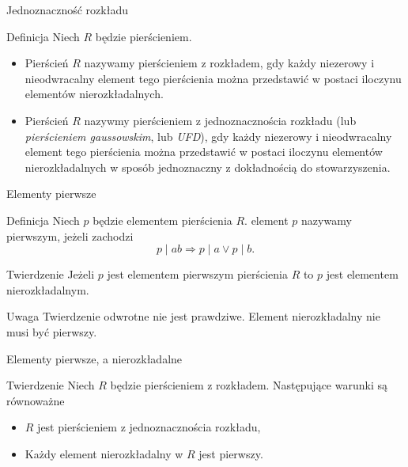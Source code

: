 \documentclass{beamer}
\begin{document}
\begin{frame}{Jednoznaczność rozkładu}
    \begin{block}{Definicja}
        Niech $R$ będzie pierścieniem. 
        \begin{itemize}
            \item Pierścień $R$ nazywamy pierścieniem z rozkładem, gdy każdy niezerowy i nieodwracalny element tego pierścienia można przedstawić w postaci iloczynu elementów nierozkładalnych.
            \item Pierścień $R$ nazywmy \alert{pierścieniem z jednoznacznościa rozkładu} (lub 
            \textit{pierścieniem gaussowskim}, lub \textit{UFD}), gdy każdy niezerowy i nieodwracalny element tego pierścienia można
            przedstawić w postaci iloczynu elementów nierozkładalnych w sposób jednoznaczny z dokładnością do stowarzyszenia.
        \end{itemize}
    \end{block}
\end{frame}

\begin{frame}{Elementy pierwsze}
    \begin{block}{Definicja}
        Niech $p$ będzie elementem pierścienia $R$. element $p$ nazywamy \alert{pierwszym}, jeżeli zachodzi 
        $$p \mid ab \Rightarrow p \mid a \lor p \mid b.$$
    \end{block}
    \pause 
    \begin{block}{Twierdzenie}
        Jeżeli $p$ jest elementem pierwszym pierścienia $R$ to $p$ jest elementem nierozkładalnym. 
    \end{block}
    \pause 
    \begin{alertblock}{Uwaga}
        Twierdzenie odwrotne nie jest prawdziwe. Element nierozkładalny nie musi być pierwszy.
    \end{alertblock}
\end{frame}

\begin{frame}{Elementy pierwsze, a nierozkładalne}
    \begin{block}{Twierdzenie}
        Niech $R$ będzie pierścieniem z rozkładem. Następujące warunki są równoważne
        \begin{itemize}
            \item $R$ jest pierścieniem z jednoznacznościa rozkładu, 
            \item Każdy element nierozkładalny w $R$ jest pierwszy.
        \end{itemize}
    \end{block}
\end{frame}
\end{document}
